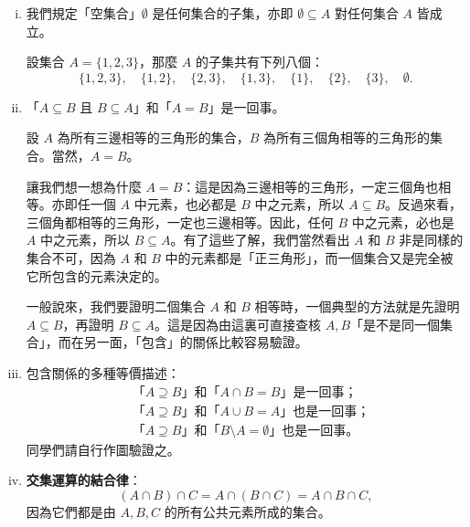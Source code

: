 \begin{enumerate}[(i)]
  \item 我們規定「空集合」$\emptyset$ 是任何集合的子集，亦即 $\emptyset \subseteq A$ 對任何集合 $A$ 皆成立。
  \begin{example}\label{ex:2-3-13}
  設集合 $A = \{1, 2, 3\}$，那麼 $A$ 的子集共有下列八個：
  \begin{equation*}
    \{1, 2, 3\}, \quad \{1, 2\}, \quad \{2, 3\}, \quad \{1, 3\}, \quad \{1\}, \quad \{2\}, \quad \{3\}, \quad \emptyset.
  \end{equation*}
  \end{example}

  \item 「$A \subseteq B$ 且 $B \subseteq A$」和「$A = B$」是一回事。
  \begin{example}\label{ex:2-3-14}
  設 $A$ 為所有三邊相等的三角形的集合，$B$ 為所有三個角相等的三角形的集合。當然，$A = B$。
  
  讓我們想一想為什麼 $A = B$：這是因為三邊相等的三角形，一定三個角也相等。亦即任一個 $A$ 中元素，也必都是 $B$ 中之元素，所以 $A \subseteq B$。反過來看，三個角都相等的三角形，一定也三邊相等。因此，任何 $B$ 中之元素，必也是 $A$ 中之元素，所以 $B \subseteq A$。有了這些了解，我們當然看出 $A$ 和 $B$ 非是同樣的集合不可，因為 $A$ 和 $B$ 中的元素都是「正三角形」，而一個集合又是完全被它所包含的元素決定的。
  
  一般說來，我們要證明二個集合 $A$ 和 $B$ 相等時，一個典型的方法就是先證明 $A \subseteq B$，再證明 $B \subseteq A$。這是因為由這裏可直接查核 $A, B$「是不是同一個集合」，而在另一面，「包含」的關係比較容易驗證。
  \end{example}

  \item 包含關係的多種等價描述：
  \begin{align*}
    &\text{「} A \supseteq B \text{」和「} A \cap B = B \text{」是一回事；} \\
    &\text{「} A \supseteq B \text{」和「} A \cup B = A \text{」也是一回事；} \\
    &\text{「} A \supseteq B \text{」和「} B \setminus A = \emptyset \text{」也是一回事。}
  \end{align*}
  同學們請自行作圖驗證之。

  \item \textbf{交集運算的結合律}：
  \begin{equation}\label{eq:assoc_intersection}
    (A \cap B) \cap C = A \cap (B \cap C) = A \cap B \cap C,
  \end{equation}
  因為它們都是由 $A, B, C$ 的所有公共元素所成的集合。


\end{enumerate}
